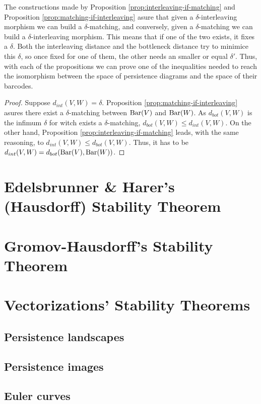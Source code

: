 The constructions made by Proposition \ref{prop:interleaving-if-matching} and Proposition \ref{prop:matching-if-interleaving} asure that given a $\delta$-interleaving morphism we can build a $\delta$-matching, and conversely, given a $\delta$-matching we can build a $\delta$-interleaving morphism. This means that if one of the two exists, it fixes a $\delta$. Both the interleaving distance and the bottleneck distance try to minimice this $\delta$, so once fixed for one of them, the other needs an smaller or equal $\delta'$. Thus, with each of the propositions we can prove one of the inequalities needed to reach the isomorphism between the space of persistence diagrams and the space of their barcodes.

\Stability*
\begin{proof}
    Suppose $ d_{int}(V, W) = \delta $. Proposition \ref{prop:matching-if-interleaving} asures there exist a $\delta$-matching between $ \operatorname{Bar}(V) $ and $ \operatorname{Bar} (W) $. As $ d_{bot}(V, W) $ is the infimum $\delta$ for witch exists a $\delta$-matching, $ d_{bot}(V, W) \leq d_{int}(V, W)$. On the other hand, Proposition \ref{prop:interleaving-if-matching} leads, with the same reasoning, to $ d_{int}(V, W) \leq d_{bot}(V, W)$. Thus, it has to be $ d_{int} (V, W) = d_{bot} (\operatorname{Bar}(V), \operatorname{Bar}(W)) $.
\end{proof}
\chapter{Edelsbrunner \& Harer's (Hausdorff) Stability Theorem}

\chapter{Gromov-Hausdorff's Stability Theorem}

\chapter{Vectorizations' Stability Theorems}
\section{Persistence landscapes}
\section{Persistence images}
\section{Euler curves}